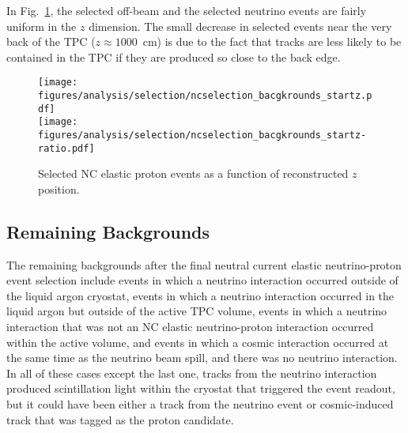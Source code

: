     In Fig.~\ref{fig:ncestartz}, the selected off-beam and the selected
    neutrino events are fairly uniform in the $z$ dimension. The small decrease
    in selected events near the very back of the TPC ($z \approx 1000$~cm) is
    due to the fact that tracks are less likely to be contained in the TPC if
    they are produced so close to the back edge.
    \begin{figure}[ht]
      \centering
      \texttt{[image: figures/analysis/selection/ncselection\_bacgkrounds\_startz.pdf]} \\
      \texttt{[image: figures/analysis/selection/ncselection\_bacgkrounds\_startz-ratio.pdf]} \\
      \caption{Selected NC elastic proton events as a function of reconstructed $z$ position.}
      \label{fig:ncestartz}
    \end{figure}

    \FloatBarrier

\subsection{Remaining Backgrounds}\label{sec:effbg}
  The remaining backgrounds after the final neutral current elastic
  neutrino-proton event selection include events in which a neutrino
  interaction occurred outside of the liquid argon cryostat, events in which a
  neutrino interaction occurred in the liquid argon but outside of the active
  TPC volume, events in which a neutrino interaction that was not an NC elastic
  neutrino-proton interaction occurred within the active volume, and events in
  which a cosmic interaction occurred at the same time as the neutrino beam
  spill, and there was no neutrino interaction. In all of these cases except
  the last one, tracks from the neutrino interaction produced scintillation
  light within the cryostat that triggered the event readout, but it could have
  been either a track from the neutrino event or cosmic-induced track that was
  tagged as the proton candidate.

